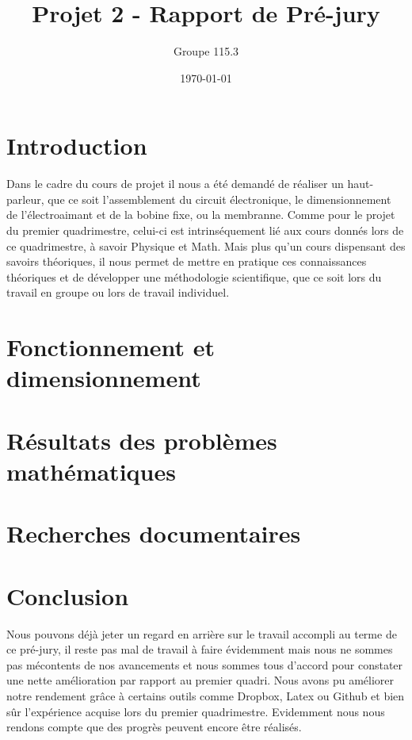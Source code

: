 \documentclass{report}
\title{Projet 2 - Rapport de Pré-jury}
\author{Groupe 115.3}
\date{\today}
\begin{document}
\maketitle
\tableofcontents
\clearpage

\chapter{Introduction}

Dans le cadre du cours de projet il nous a été demandé de réaliser un haut-parleur, 
que ce soit l'assemblement du circuit électronique, le dimensionnement de l'électroaimant
et de la bobine fixe, ou la membranne. Comme pour le projet du premier quadrimestre, 
celui-ci est intrinséquement lié aux cours donnés lors de ce quadrimestre, à savoir Physique
et Math. Mais plus qu'un cours dispensant des savoirs théoriques, il nous permet de mettre
en pratique ces connaissances théoriques et de développer une méthodologie scientifique, que 
ce soit lors du travail en groupe ou lors de travail individuel.

\chapter{Fonctionnement et dimensionnement}





\chapter{Résultats des problèmes mathématiques}





\chapter{Recherches documentaires}





\chapter{Conclusion}

Nous pouvons déjà jeter un regard en arrière sur le travail accompli au terme de ce pré-jury,
il reste pas mal de travail à faire évidemment mais nous ne sommes pas mécontents de nos 
avancements et nous sommes tous d'accord pour constater une nette amélioration par rapport au premier quadri. 
Nous avons pu améliorer notre rendement grâce à certains outils comme Dropbox, Latex ou Github 
et bien sûr l'expérience acquise lors du premier quadrimestre. Evidemment nous nous rendons compte 
que des progrès peuvent encore être réalisés.
\end{document}
